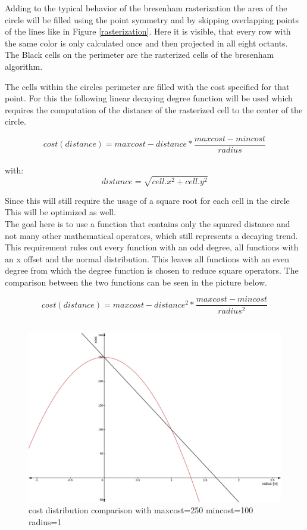 Adding to the typical behavior of the bresenham rasterization the area of the circle will be filled using the point symmetry and by skipping overlapping points of the lines like in Figure \ref{rasterization}. Here it is visible, that every row with the same color is only calculated once and then projected in all eight octants. The Black cells on the perimeter are the rasterized cells of the bresenham algorithm.

The cells within the circles perimeter are filled with the cost specified for that point. For this the following linear decaying  degree function will be used which requires the computation of the distance of the rasterized cell to the center of the circle.

\[cost(distance)=maxcost-distance*\frac{maxcost-mincost}{radius}\]\\
with: \[distance=\sqrt{cell.x^2+cell.y^2}\]

 Since this will still require the usage of a square root for each cell in the circle This will be optimized as well.\\

The goal here is to use a function that contains only the squared distance and not many other mathematical operators, which still represents a decaying trend. This requirement rules out every function with an odd degree, all functions with an x offset and the normal distribution. This leaves all functions with an even degree from which the  degree function is chosen to reduce square operators. The comparison between the two functions can be seen in the picture below.

\[cost(distance)=maxcost-distance^2*\frac{maxcost-mincost}{radius^2}\]\\

\begin{figure}[H]
	\begin{center}
	\includegraphics[width=140mm]{Pictures/linear cost comparison}
	\caption{cost distribution comparison with maxcost=250 mincost=100 radius=1}
	\end{center}
\end{figure}



